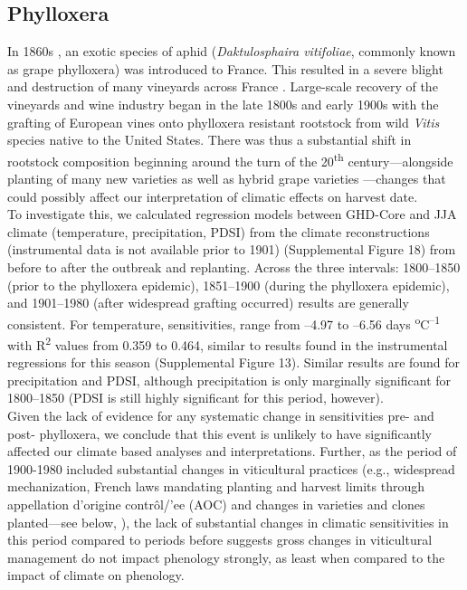 \documentclass[12pt]{article}
\begin{document}
\subsection*{Phylloxera}
\noindent In 1860s \cite{Lachiver1988}, an exotic species of aphid (\emph{Daktulosphaira vitifoliae}, commonly known as grape phylloxera) was introduced to France. This resulted in a severe blight and destruction of many vineyards across France \cite{Lachiver1988,Loubere1978,Loubere1990,Paul1996,Bouquet2002}. Large-scale recovery of the vineyards and wine industry began in the late 1800s and early 1900s with the grafting of European vines onto phylloxera resistant rootstock from wild \emph{Vitis} species native to the United States. There was thus a substantial shift in rootstock composition beginning around the turn of the 20\textsuperscript{th} century---alongside planting of many new varieties as well as hybrid grape varieties \cite{Lachiver1988,Bouquet2002}---changes that could possibly affect our interpretation of climatic effects on harvest date.\\
\indent To investigate this, we calculated regression models between GHD-Core and JJA climate (temperature, precipitation, PDSI) from the climate reconstructions (instrumental data is not available prior to 1901) (Supplemental Figure 18) from before to after the outbreak and replanting. Across the three intervals: 1800--1850 (prior to the phylloxera epidemic), 1851--1900 (during the phylloxera epidemic), and 1901--1980 (after widespread grafting occurred) results are generally consistent. For temperature, sensitivities, range from --4.97 to --6.56 days \textsuperscript{o}C\textsuperscript{--1} with R\textsuperscript{2} values  from 0.359 to 0.464, similar to results found in the instrumental regressions for this season (Supplemental Figure 13). Similar results are found for precipitation and PDSI, although precipitation is only marginally significant for 1800--1850 (PDSI is still highly significant for this period, however). \\
Given the lack of evidence for any systematic change in sensitivities pre- and post- phylloxera, we conclude that this event is unlikely to have significantly affected our climate based analyses and interpretations. Further, as the period of 1900-1980 included substantial changes in viticultural practices (e.g., widespread mechanization, French laws mandating planting and harvest limits through appellation d'origine contr\^ol/'ee (AOC) and changes in varieties and clones planted---see below, \cite{Loubere1990,Paul1996}), the lack of substantial changes in climatic sensitivities in this period compared to periods before suggests gross changes in viticultural management do not impact phenology strongly, as least when compared to the impact of climate on phenology.
\end{document}
